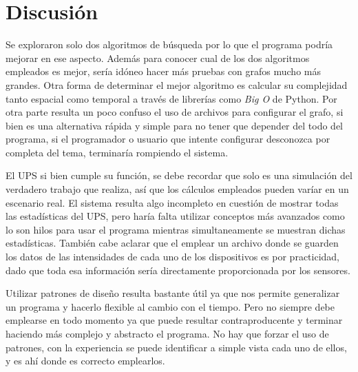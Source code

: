 \documentclass[runningheads]{llncs}
\begin{document}
    \section{Discusión}

        Se exploraron solo dos algoritmos de búsqueda por lo que el programa podría mejorar en ese aspecto. Además para conocer cual de los dos algoritmos empleados es mejor, sería idóneo hacer más pruebas con grafos mucho más grandes. Otra forma de determinar el mejor algoritmo es calcular su complejidad tanto espacial como temporal a través de librerías como \emph{Big O} de Python. Por otra parte resulta un poco confuso el uso de archivos para configurar el grafo, si bien es una alternativa rápida y simple para no tener que depender del todo del programa, si el programador o usuario que intente configurar desconozca por completa del tema, terminaría rompiendo el sistema.

        El UPS si bien cumple su función, se debe recordar que solo es una simulación del verdadero trabajo que realiza, así que los cálculos empleados pueden varíar en un escenario real. El sistema resulta algo incompleto en cuestión de mostrar todas las estadísticas del UPS, pero haría falta utilizar conceptos más avanzados como lo son hilos para usar el programa mientras simultaneamente se muestran dichas estadísticas. También cabe aclarar que el emplear un archivo donde se guarden los datos de las intensidades de cada uno de los dispositivos es por practicidad, dado que toda esa información sería directamente proporcionada por los sensores.

        Utilizar patrones de diseño resulta bastante útil ya que nos permite generalizar un programa y hacerlo flexible al cambio con el tiempo. Pero no siempre debe emplearse en todo momento ya que puede resultar contraproducente y terminar haciendo más complejo y abstracto el programa. No hay que forzar el uso de patrones, con la experiencia se puede identificar a simple vista cada uno de ellos, y es ahí donde es correcto emplearlos.
\end{document}
